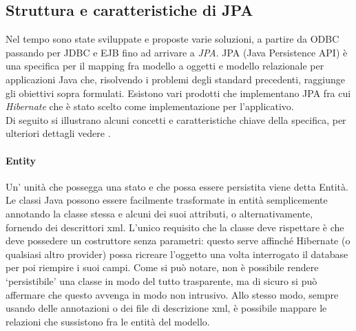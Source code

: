 \subsection{Struttura e caratteristiche di JPA}
Nel tempo sono state sviluppate e proposte varie soluzioni, a partire da ODBC passando per JDBC e EJB fino ad arrivare a \textsl{JPA}.
JPA (Java Persistence API) è una specifica per il mapping fra modello a oggetti e modello relazionale per applicazioni Java che, risolvendo i problemi degli standard precedenti, raggiunge
gli obiettivi sopra formulati. Esistono vari prodotti che implementano JPA fra cui \textsl{Hibernate} che è stato scelto come
implementazione per l'applicativo.\\
Di seguito si illustrano alcuni concetti e caratteristiche chiave della specifica, per ulteriori dettagli vedere \cite{jpa}.

\paragraph{Entity}
Un' unità che possegga una stato e che possa essere persistita viene detta Entità. Le classi Java possono essere facilmente trasformate in entità semplicemente annotando la classe stessa e alcuni dei suoi attributi, o alternativamente,
fornendo dei descrittori xml. L'unico
requisito che la classe deve rispettare è che deve possedere un costruttore senza parametri: questo serve affinché Hibernate (o qualsiasi altro provider) possa ricreare l'oggetto una volta interrogato il database per poi riempire i suoi campi.
Come si può notare, 
non è possibile rendere \textquoteleft persistibile\textquoteright{} una classe in modo del tutto trasparente, ma di sicuro si può affermare che questo avvenga in modo non intrusivo. Allo stesso modo, sempre usando delle annotazioni o dei file di descrizione xml, 
è possibile mappare le relazioni che sussistono fra le entità del modello.

